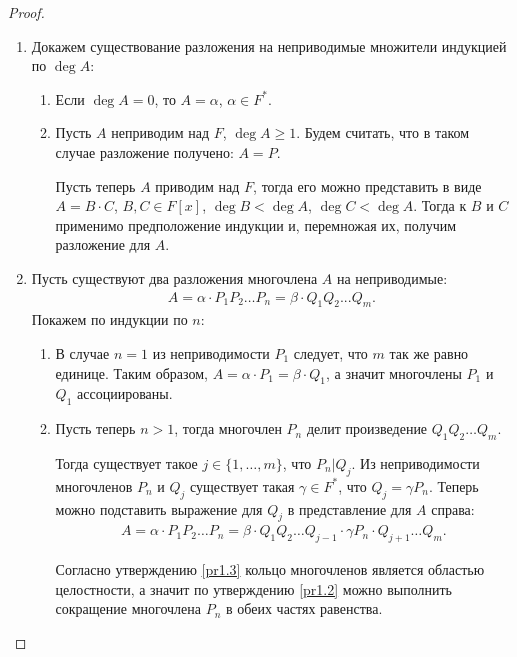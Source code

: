 \begin{proof}~
    \begin{enumerate}
        \item Докажем существование разложения на неприводимые множители индукцией по $\deg A$:
        \begin{enumerate}
            \item Если $\deg A = 0$, то $A = \alpha$, $\alpha \in F^*$. 
            \item Пусть $A$ неприводим над $F$, $\deg A \geq 1$. Будем считать, что в таком случае 
            разложение получено: $A = P$.

            Пусть теперь $A$ приводим над $F$, тогда его можно представить в виде $A = B \cdot C$, 
            $B, C \in F[x]$, $\deg B < \deg A$, $\deg C < \deg A$. Тогда  к $B$ и $C$ применимо 
            предположение индукции и, перемножая их, получим разложение для $A$.
        \end{enumerate}
        \item Пусть существуют два разложения многочлена $A$ на неприводимые:
        \begin{gather*}
            A = \alpha \cdot P_1P_2 \dots P_n = \beta \cdot Q_1Q_2...Q_m.
        \end{gather*}
        Покажем по индукции по $n$:
        \begin{enumerate}
            \item В случае $n=1$ из неприводимости $P_1$ следует, что $m$ так же равно единице.
            Таким образом, $A = \alpha \cdot P_1 = \beta \cdot Q_1$, а значит многочлены $P_1$ и $Q_1$ 
            ассоциированы. 
            \item Пусть теперь $n > 1$, тогда многочлен $P_n$ делит произведение $Q_1Q_2 \dots Q_m$.
            
            Тогда существует такое $j \in \{ 1, \dots, m\}$, что $P_n \vert Q_j$. 
            Из неприводимости многочленов $P_n$ и $Q_j$ существует такая $\gamma \in F^*$, что $Q_j = \gamma P_n$.
            Теперь можно подставить выражение для $Q_j$ в представление для $A$ справа:
            \begin{gather*}
                A = \alpha \cdot P_1P_2 \dots P_n = \beta \cdot Q_1Q_2 \dots Q_{j-1} \cdot \gamma 
                P_n \cdot Q_{j+1} \dots Q_m.
            \end{gather*} 
            
            Согласно утверждению \ref{pr1.3} 
            кольцо многочленов является областью целостности, а значит по утверждению \ref{pr1.2} 
            можно выполнить сокращение многочлена $P_n$ в обеих частях равенства. 
            

\end{enumerate}
\end{enumerate}
\end{proof}
